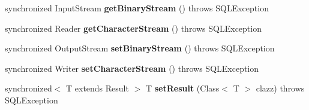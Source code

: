 \begin{DoxyCompactItemize}
\mbox{\label{classcom_1_1mysql_1_1cj_1_1jdbc_1_1_mysql_s_q_l_x_m_l_ade81fe7aaf81880f4c8afe0959dd56c4}} 
synchronized Input\+Stream {\bfseries get\+Binary\+Stream} ()  throws S\+Q\+L\+Exception 
\item 
\mbox{\label{classcom_1_1mysql_1_1cj_1_1jdbc_1_1_mysql_s_q_l_x_m_l_a52f8afb7b30fe00098127bb05b130652}} 
synchronized Reader {\bfseries get\+Character\+Stream} ()  throws S\+Q\+L\+Exception 
\item 
\mbox{\label{classcom_1_1mysql_1_1cj_1_1jdbc_1_1_mysql_s_q_l_x_m_l_ad6b44dc062b3ad75cfc723dee3a03b21}} 
synchronized Output\+Stream {\bfseries set\+Binary\+Stream} ()  throws S\+Q\+L\+Exception 
\item 
\mbox{\label{classcom_1_1mysql_1_1cj_1_1jdbc_1_1_mysql_s_q_l_x_m_l_ae84885df28f44ed061ec12063718d8c2}} 
synchronized Writer {\bfseries set\+Character\+Stream} ()  throws S\+Q\+L\+Exception 
\item 
\mbox{\label{classcom_1_1mysql_1_1cj_1_1jdbc_1_1_mysql_s_q_l_x_m_l_a099fb4f81f28300defc9672636b04b18}} 
synchronized$<$ T extends Result $>$ T {\bfseries set\+Result} (Class$<$ T $>$ clazz)  throws S\+Q\+L\+Exception 
\end{DoxyCompactItemize}
